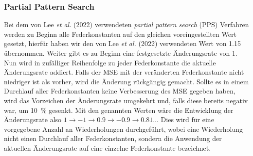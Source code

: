 \documentclass[10pt]{scrartcl}
\newcommand*{\eng}[1]{\textit{#1}}
\newcommand*{\feng}[1]{\eng{#1}}
\newcommand{\lee}{Lee {\itshape et al.} (2022)}
\begin{document}
\subsubsection{Partial Pattern Search}

Bei dem von \lee{} verwendeten \feng{partial pattern search} (PPS) Verfahren werden zu Beginn alle Federkonstanten auf den gleichen voreingestellten Wert gesetzt, hierfür  haben wir den von \lee{} verwendeten Wert von \num{1,15} übernommen.
Weiter gibt es zu Beginn eine festgesetzte Änderungsrate von 1.
Nun wird in zufälliger Reihenfolge zu jeder Federkonstante die aktuelle Änderungsrate addiert. Falls der MSE mit der veränderten Federkonstante nicht niedriger ist als vorher, wird die Änderung rückgängig gemacht.
Sollte es in einem Durchlauf aller Federkonstanten keine Verbesserung des MSE gegeben haben, wird das Vorzeichen der Änderungsrate umgekehrt und, falls diese bereits negativ war, um \SI{10}{\percent} gesenkt. Mit den genannten Werten wäre die Entwicklung der Änderungsrate also $1 \rightarrow -1 \rightarrow 0.9 \rightarrow -0.9 \rightarrow 0.81 \dots$
Dies wird für eine vorgegebene Anzahl an Wiederholungen durchgeführt, wobei eine Wiederholung nicht einen Durchlauf aller Federkonstanten, sondern die Anwendung der aktuellen Änderungsrate auf eine einzelne Federkonstante bezeichnet.



\end{document}
